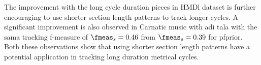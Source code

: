 The improvement with the long cycle duration pieces in \acrshort{HMDl} dataset is further encouraging to use shorter section length patterns to track longer cycles. A significant improvement is also observed in Carnatic music with \gls{adi} \gls{tala} with the sama tracking f-measure of $\fmeas_s = 0.46$ from $\fmeas_s = 0.39$ for \acrshort{pfprior}. Both these observations show that using shorter section length patterns have a potential application in tracking long duration metrical cycles. 
% 
%
% 
% 
% 
